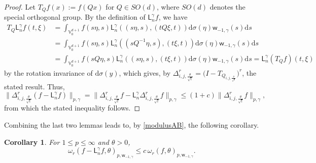 \documentclass{amsart}
\newtheorem{cor}[thm]{Corollary}
\theoremstyle{remark}
\def\d{\mathrm{d}}
\def\g{{\gamma}}
\def\t{{\theta}}
\def\o{{\omega}}
\def\s{\sigma}
\def\VV{{\mathbb V}}
\def\d{\mathrm{d}}
\def\sL{{\mathsf L}}
\def\sw{{\mathsf w}}
\def\g{{\gamma}}
\def\t{{\theta}}
\def\o{{\omega}}
\def\s{\sigma}
\def\VV{{\mathbb V}}
\def\f{\frac}
\def\f{\frac}
\begin{document}
\begin{proof}
Let $T_Q f(x) := f(Q x)$ for $Q\in SO(d)$, where $SO(d)$ denotes  the special orthogonal group. By the definition of
$\sL_n^\g f$, we have
\begin{align*}
 T_Q \sL_n^\g f(t, \xi)  & = \int_{\VV_0^{d+1}} f(s\eta,s) \sL_{n}^{\gamma}\left( (s\eta,s),(tQ\xi,t)\right) \d \sigma(\eta)\sw_{-1,\gamma}(s) \d s \\
  & =\int_{\VV_0^{d+1}} f(s\eta,s) \sL_{n}^{\gamma}\left( (sQ^{-1}\eta,s),(t\xi,t)\right) \d \sigma(\eta)\sw_{-1,\gamma}(s) \d s \\
  & =\int_{\VV_0^{d+1}} f(sQ\eta,s) \sL_{n}^{\gamma}\left( (s\eta,s),(t\xi,t)\right) \d \sigma(\eta)\sw_{-1,\gamma}(s) \d s 
     =    \sL_n^\g (T_Qf)( t,  \xi)
\end{align*}
by the rotation invariance of $\d \s(y)$, which gives, by $\Delta_{i,j,\f{\theta}{\sqrt{t}}}^r = \Big(I -T_{Q_{i,j,\f{\t}{\sqrt{t}}}}\Big)^r$, the stated result. Thus, 
$$
 \Big \|\Delta_{i,j,\f{\theta}{\sqrt{t}}}^r ( f - \sL_n^\g f)\Big\|_{p,\gamma} =  \Big\|\Delta_{i,j,\f{\t}{\sqrt{t}}}^r f - \sL_n^\g  \Delta_{i,j,\f{\t}{\sqrt{t}}}^r  f\Big \|_{p,\gamma}
    \le (1+ c) \Big \|\Delta_{i,j,\f{\t}{\sqrt{t}}}^r f \Big \|_{p,\gamma},
$$
from which the stated inequality follows.
\end{proof} 

Combining the last two lemmas leads to, by \eqref{modulusAB}, the following corollary. 

\begin{cor} \label{cor:3.9}
For $1 \le p \le \infty$ and $\t > 0$, 
$$
\o_r  \left(f- \sL_n^\g f, \t\right)_{p,\sw_{-1,\g}} \le c\, \o_r (f,\t)_{p, \sw_{-1,\g}}.
$$
\end{cor}
\end{document}
